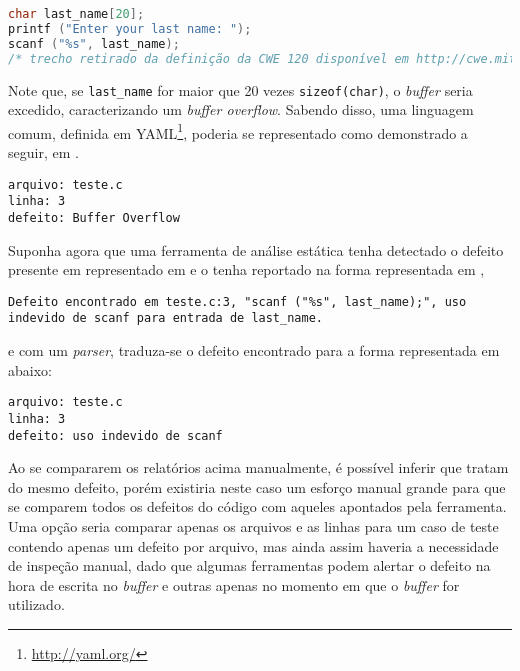 \begin{lstlisting}[breaklines=true, language=C, title=cwe120.c, caption=Exemplo de CWE 120, label=exemplo_cwe120]
char last_name[20];
printf ("Enter your last name: ");
scanf ("%s", last_name);
/* trecho retirado da definição da CWE 120 disponível em http://cwe.mitre.org/data/definitions/120.html */
\end{lstlisting}

Note que, se \lstinline{last_name} for maior que 20 vezes \lstinline{sizeof(char)}, o \textit{buffer} seria excedido, caracterizando um \textit{buffer overflow}. Sabendo disso, uma linguagem comum, definida em YAML\footnote{\url{http://yaml.org/}}, poderia se representado como demonstrado a seguir, em .

\begin{lstlisting}[breaklines=true, caption=Relatório de erros do Exemplo de CWE 120,label=relatorio_cwe120]
arquivo: teste.c
linha: 3
defeito: Buffer Overflow
\end{lstlisting}

Suponha agora que uma ferramenta de análise estática tenha detectado o defeito presente em  representado em  e o tenha reportado na forma representada em ,
\begin{lstlisting}[breaklines=true, caption=Relatório de análise de uma ferramenta qualquer, label=relatorio_ferramenta_qualquer]
Defeito encontrado em teste.c:3, "scanf ("%s", last_name);", uso indevido de scanf para entrada de last_name.
\end{lstlisting}
e com um \textit{parser}, traduza-se o defeito encontrado para a forma representada em  abaixo:
\begin{lstlisting}[breaklines=true, label=relatorio_ferramenta_qualquer_yaml, caption=Relatório de uma ferramenta qualquer em YAML]
arquivo: teste.c
linha: 3
defeito: uso indevido de scanf
\end{lstlisting}

Ao se compararem os relatórios acima manualmente, é possível inferir que tratam do mesmo defeito, porém existiria neste caso um esforço manual grande para que se comparem todos os defeitos do código com aqueles apontados pela ferramenta. Uma opção seria comparar apenas os arquivos e as linhas para um caso de teste contendo apenas um defeito por arquivo, mas ainda assim haveria a necessidade de inspeção manual, dado que algumas ferramentas podem alertar o defeito na hora de escrita no \textit{buffer} e outras apenas no momento em que o \textit{buffer} for utilizado.

